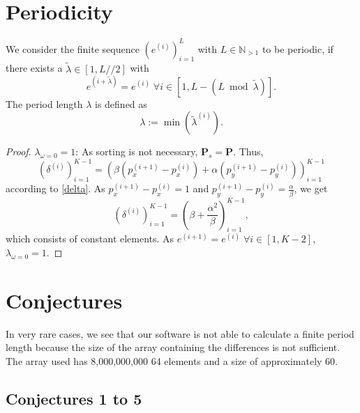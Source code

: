 \documentclass[11pt]{article}
\theoremstyle{remark}
\begin{document}
\section{Periodicity}

We consider the finite sequence $\left(e^{(i)}\right)_{i=1}^{L}$ with $L \in \mathbb{N}_{>1}$ to be periodic, if there exists a $\tilde{\lambda} \in [1, L//2]$ with 
%
\begin{equation}
e^{(i+\tilde{\lambda})} = e^{(i)} \; \forall i \in [1, L - (L \bmod \tilde{\lambda})].
\end{equation}
%
The period length $\lambda$ is defined as
%
\begin{equation}
\lambda := \min\left(\tilde{\lambda}^{(i)} \right).
\end{equation}
%
\begin{proof}
$\lambda_{\omega = 0} = 1$: As sorting is not necessary, $\mathbf{P}_s = \mathbf{P}$. Thus,
%
\begin{equation}
\left(\delta^{(i)}\right)_{i=1}^{K-1} = \left(\beta \left(p_x^{(i+1)} - p_x^{(i)}\right) + \alpha \left(p_y^{(i+1)} - p_y^{(i)}\right)\right)_{i=1}^{K-1}
\end{equation}
%
according to \ref{delta}. As $p_x^{(i+1)} - p_x^{(i)} = 1$ and $p_y^{(i+1)} - p_y^{(i)} = \frac{\alpha}{\beta}$, we get
\begin{equation}
\left(\delta^{(i)}\right)_{i=1}^{K-1} = \left(\beta + \frac{\alpha^2}{\beta}\right)_{i=1}^{K-1},
\end{equation}
%
which consists of constant elements. As $e^{(i+1)} = e^{(i)} \; \forall i \in [1, K-2]$, $\lambda_{\omega = 0} = 1$.
\end{proof}

\section{Conjectures}

In very rare cases, we see that our \langc software is not able to calculate a finite period length because the size of the array containing the differences is not sufficient. The array used has 8,000,000,000 \SI{64}{\bit} elements and a size of approximately \SI{60}{\gigabyte}.

\subsection{Conjectures 1 to 5}
\end{document}
